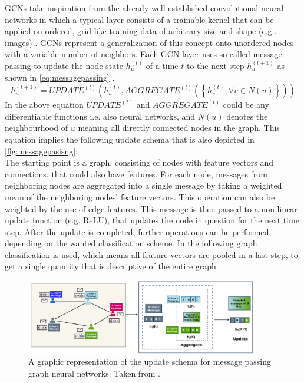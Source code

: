 \documentclass[11pt,a4paper]{article}
\begin{document}
GCNs take inspiration from the already well-established convolutional neural networks in which a typical layer consists of a trainable kernel that can be applied on ordered, grid-like training data of arbitrary size and shape (e.g.. images) \cite{khemaniReviewGraphNeural2024}. 
GCNs represent a generalization of this concept onto unordered nodes with a variable number of neighbors. 
Each GCN-layer uses so-called message passing to update the node state $h^{(t)}_u$ of a time $t$ to the next step $h^{(t+1)}_u$ as shown in \autoref{eq:messagepassing} \cite[eq. 4.1]{khemaniReviewGraphNeural2024}.
\begin{equation}
h^{(t+1)}_u = UPDATE^{(t)}\left(h^{(t)}_u, AGGREGATE^{(t)}\left(\left\{h^{(t)}_v, \forall v \in N(u)\right\}\right)\right)
\label{eq:messagepassing}
\end{equation}
In the above equation $UPDATE^{(t)}$ and $AGGREGATE^{(t)}$ could be any differentiable functions i.e. also neural networks, and $N(u)$ denotes the neighbourhood of $u$ meaning all directly connected nodes in the graph. 
This equation implies the following update schema that is also depicted in \autoref{fig:messagepasisng}: \\
The starting point is a graph, consisting of nodes with feature vectors and connections, that could also have features. 
For each node, messages from neighboring nodes are aggregated into a single message by taking a weighted mean of the neighboring nodes' feature vectors. 
This operation can also be weighted by the use of edge features. 
This message is then passed to a non-linear update function (e.g. ReLU), that updates the node in question for the next time step. 
After the update is completed, further operations can be performed depending on the wanted classification scheme. 
In the following graph classification is used, which means all feature vectors are pooled in a last step, to get a single quantity that is descriptive of the entire graph \cite{khemaniReviewGraphNeural2024}.
\begin{figure}[htbp]
\centering
\includegraphics[width=0.9\textwidth]{images/khemani7.png}
\caption{A graphic representation of the update schema for message passing graph neural networks. Taken from \cite[Fig. 7]{khemaniReviewGraphNeural2024}.}
\label{fig:messagepasisng}
\end{figure}
\end{document}
